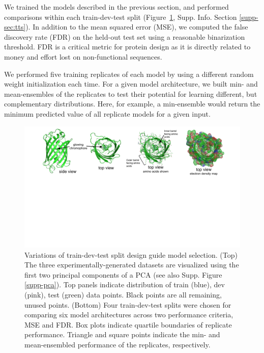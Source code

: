 We trained the models described in the previous section, and performed comparisons within each train-dev-test split (Figure~\ref{fig-tts}, Supp. Info. Section \ref{supp-sec:tts}). In addition to the mean squared error (MSE), we computed the false discovery rate (FDR) on the held-out test set using a reasonable binarization threshold. FDR is a critical metric for protein design as it is directly related to money and effort lost on non-functional sequences.

We performed five training replicates of each model by using a different random weight initialization each time. For a given model architecture, we built min- and mean-ensembles of the replicates to test their potential for learning different, but complementary distributions. Here, for example, a min-ensemble would return the minimum predicted value of all replicate models for a given input. 

\begin{figure}
  \includegraphics[width=1\linewidth,page=3,trim={1cm 0.5cm 1cm 0}]{figures/2018-05-09-NIPS_2018_Figures.pdf}
  \caption[Variations of train-dev-test split design guide model selection.]{\small{
    Variations of train-dev-test split design guide model selection. (Top) The three experimentally-generated datasets are visualized using the first two principal components of a PCA (see also Supp. Figure \ref{supp-pca}). Top panels indicate distribution of train (blue), dev (pink), test (green) data points. Black points are all remaining, unused points. (Bottom) Four train-dev-test splits were chosen for comparing six model architectures across two performance criteria, MSE and FDR.  Box plots indicate quartile boundaries of replicate performance. Triangle and square points indicate the min- and mean-ensembled performance of the replicates, respectively.}
    }
    \label{fig-tts}
    \vspace{-0.6cm}
\end{figure}

